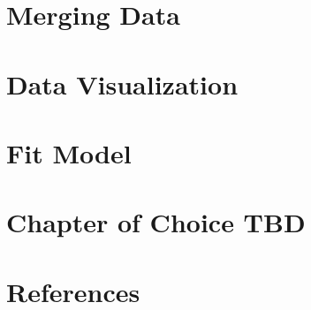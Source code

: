 \documentclass[
]{article}
\begin{document}
\hypertarget{merging-data}{%
\section{Merging Data}\label{merging-data}}

\pagebreak

\hypertarget{data-visualization}{%
\section{Data Visualization}\label{data-visualization}}

\pagebreak

\hypertarget{fit-model}{%
\section{Fit Model}\label{fit-model}}

\pagebreak

\hypertarget{chapter-of-choice-tbd}{%
\section{Chapter of Choice TBD}\label{chapter-of-choice-tbd}}

\pagebreak

\hypertarget{references}{%
\section{References}\label{references}}
\end{document}
